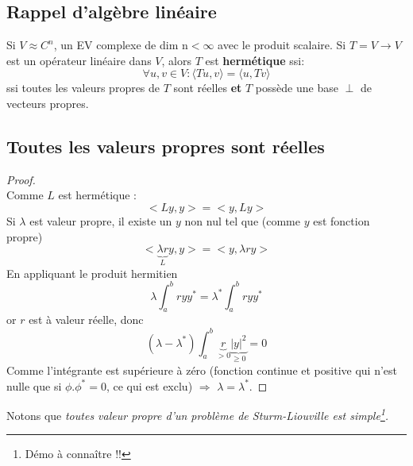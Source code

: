 \documentclass	[11pt, a4paper, openany]{book}
\begin{document}
			\subsection{Rappel d'algèbre linéaire}
			Si $V \approx C^n$, un EV complexe de dim n$< \infty$ avec le produit scalaire. Si $T = V \rightarrow V$ est un opérateur linéaire dans $V$, alors $T$ est \textbf{hermétique} ssi:
			\begin{equation}
				\forall u,v \in V : \langle Tu,v \rangle = \langle u,Tv\rangle
			\end{equation}
			ssi toutes les valeurs propres de $T$ sont réelles \textbf{et} $T$ possède une base $\perp$ de vecteurs propres.
			
			
			\subsection{Toutes les valeurs propres sont réelles}
			\begin{proof}
				\ \\
				Comme $L$ est hermétique :
				\begin{equation}
					<Ly,y> = <y,Ly>
				\end{equation}
				Si $\lambda$ est valeur propre, il existe un $y$ non nul tel que (comme $y$ est fonction propre)
				\begin{equation}
					<\underbrace{\lambda r}_{L}y, y> = <y, \lambda r y>
				\end{equation}
				En appliquant le produit hermitien
				\begin{equation}
					\lambda \int_a^b r yy^* = \lambda^* \int_a^b r yy^*
				\end{equation}
				or $r$ est à valeur réelle, donc
				\begin{equation}
					(\lambda-\lambda^*) \int_a^b \underbrace{r}_{>0} \underbrace{|y|^2}_{\geq 0} = 0
				\end{equation}
				Comme l'intégrante est supérieure à zéro (fonction continue et positive qui n'est nulle que si $\phi.\phi^* = 0$, ce qui est exclu) $\Rightarrow$ $\lambda = \lambda^*$.
			\end{proof}
			
			Notons que \textit{toutes valeur propre d'un problème de Sturm-Liouville est simple\footnote{Démo à connaître !!}.}
			
			\setcounter{subsection}{5}
\end{document}
